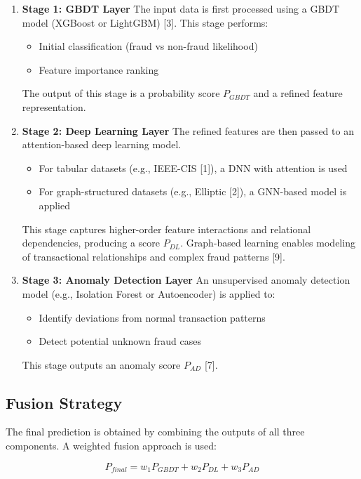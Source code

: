 \documentclass[conference]{IEEEtran}
\begin{document}
\begin{enumerate}
    \item \textbf{Stage 1: GBDT Layer}  
    The input data is first processed using a GBDT model (XGBoost or LightGBM) [3].  
    This stage performs:
    \begin{itemize}
        \item Initial classification (fraud vs non-fraud likelihood)
        \item Feature importance ranking
    \end{itemize}
    The output of this stage is a probability score $P_{GBDT}$ and a refined feature representation.

    \item \textbf{Stage 2: Deep Learning Layer}  
    The refined features are then passed to an attention-based deep learning model.  
    \begin{itemize}
        \item For tabular datasets (e.g., IEEE-CIS [1]), a DNN with attention is used
        \item For graph-structured datasets (e.g., Elliptic [2]), a GNN-based model is applied
    \end{itemize}
    This stage captures higher-order feature interactions and relational dependencies, producing a score $P_{DL}$. Graph-based learning enables modeling of transactional relationships and complex fraud patterns [9].

    \item \textbf{Stage 3: Anomaly Detection Layer}  
    An unsupervised anomaly detection model (e.g., Isolation Forest or Autoencoder) is applied to:
    \begin{itemize}
        \item Identify deviations from normal transaction patterns
        \item Detect potential unknown fraud cases
    \end{itemize}
    This stage outputs an anomaly score $P_{AD}$ [7].
\end{enumerate}

\subsection{Fusion Strategy}

The final prediction is obtained by combining the outputs of all three components. A weighted fusion approach is used:

\begin{equation}
P_{final} = w_1 P_{GBDT} + w_2 P_{DL} + w_3 P_{AD}
\end{equation}
\end{document}
